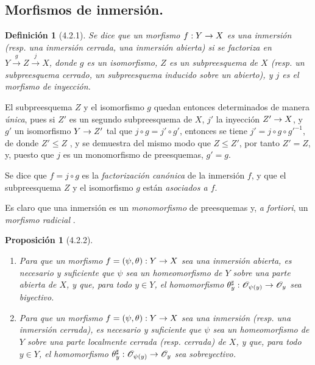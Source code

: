 \documentclass[oneside]{amsart}
\theoremstyle{ega-env-style}
\theoremstyle{ega-thm-env-style}
\newtheorem*{proposition}{Proposición}
\theoremstyle{ega-defn-env-style}
\newtheorem*{definition}{Definición}
\def\leq{\leqslant}                 %
\renewcommand{\to}{\mathchoice{\longrightarrow}{\rightarrow}{\rightarrow}{\rightarrow}}
\let\EGAOriginalLabel\label
\renewcommand{\label}[1]{\phantomsection\EGAOriginalLabel{#1}}
\begin{document}
\subsection{Morfismos de inmersión.}
\label{subsection:I.4.2}

\begin{definition}[4.2.1]
\label{I.4.2.1}
{\itshape Se dice que un morfismo $f:Y\to X$ es una inmersión (\textup{resp.} una inmersión cerrada, una inmersión abierta) si se factoriza en $Y\xrightarrow{g}Z\xrightarrow{j}X$, donde $g$ es un isomorfismo, $Z$ es un subpreesquema de $X$ (\textup{resp.} un subpreesquema cerrado, un subpreesquema inducido sobre un abierto), y $j$ es el morfismo de inyección.}
\end{definition}

El subpreesquema $Z$ y el isomorfismo $g$ quedan entonces determinados de manera \emph{única}, pues si $Z'$ es un segundo subpreesquema de $X$, $j'$ la inyección $Z'\to X$, y $g'$ un isomorfismo $Y\to Z'$ tal que $j\circ g=j'\circ g'$, entonces se tiene $j'=j\circ g\circ {g'}^{-1}$, de donde $Z'\leq Z$ , y se demuestra del mismo modo que $Z\leq Z'$, por tanto $Z'=Z$, y, puesto que $j$ es un monomorfismo de preesquemas, $g'=g$.

Se dice que $f=j\circ g$ es la \emph{factorización canónica} de la inmersión $f$, y que el subpreesquema $Z$ y el isomorfismo $g$ están \emph{asociados a $f$}.

Es claro que una inmersión es un \emph{monomorfismo} de preesquemas  y, \emph{a fortiori}, un \emph{morfismo radicial} .

\begin{proposition}[4.2.2]
\label{I.4.2.2}
\medskip\noindent
\begin{enumerate}
  \item[\textup{a)}] Para que un morfismo $f=(\psi,\theta):Y\to X$ sea una inmersión abierta, es necesario y suficiente que $\psi$ sea un homeomorfismo de $Y$ sobre una parte abierta de $X$, y que, para todo $y\in Y$, el homomorfismo $\theta_y^\sharp:\mathscr{O}_{\psi(y)}\to\mathscr{O}_y$ sea biyectivo.
  \item[\textup{b)}] Para que un morfismo $f=(\psi,\theta):Y\to X$ sea una inmersión (\textup{resp.} una inmersión cerrada), es necesario y suficiente que $\psi$ sea un homeomorfismo de $Y$ sobre una parte localmente cerrada (\textup{resp.} cerrada) de $X$, y que, para todo $y\in Y$, el homomorfismo $\theta_y^\sharp:\mathscr{O}_{\psi(y)}\to\mathscr{O}_y$ sea sobreyectivo.
\end{enumerate}
\end{proposition}
\end{document}
